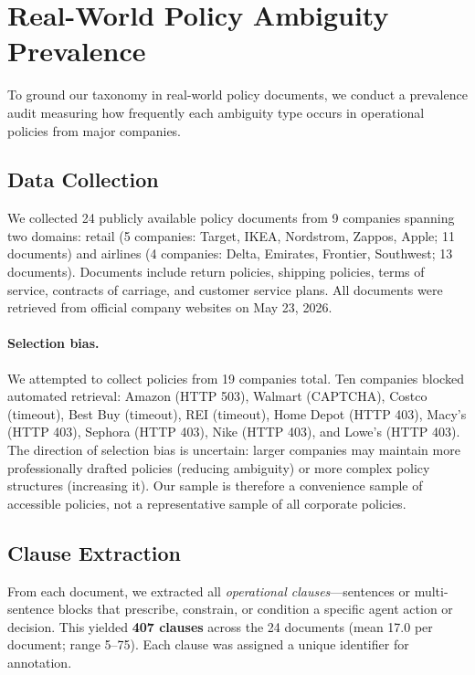 \section{Real-World Policy Ambiguity Prevalence}
\label{app:prevalence}

To ground our taxonomy in real-world policy documents, we conduct a prevalence audit measuring how frequently each ambiguity type occurs in operational policies from major companies.

\subsection{Data Collection}

We collected 24 publicly available policy documents from 9 companies spanning two domains: retail (5 companies: Target, IKEA, Nordstrom, Zappos, Apple; 11 documents) and airlines (4 companies: Delta, Emirates, Frontier, Southwest; 13 documents). Documents include return policies, shipping policies, terms of service, contracts of carriage, and customer service plans. All documents were retrieved from official company websites on May 23, 2026.

\paragraph{Selection bias.}
We attempted to collect policies from 19 companies total. Ten companies blocked automated retrieval: Amazon (HTTP 503), Walmart (CAPTCHA), Costco (timeout), Best Buy (timeout), REI (timeout), Home Depot (HTTP 403), Macy's (HTTP 403), Sephora (HTTP 403), Nike (HTTP 403), and Lowe's (HTTP 403).
The direction of selection bias is uncertain: larger companies may maintain more professionally drafted policies (reducing ambiguity) or more complex policy structures (increasing it). Our sample is therefore a convenience sample of accessible policies, not a representative sample of all corporate policies.

\subsection{Clause Extraction}

From each document, we extracted all \emph{operational clauses}---sentences or multi-sentence blocks that prescribe, constrain, or condition a specific agent action or decision. This yielded \textbf{407 clauses} across the 24 documents (mean 17.0 per document; range 5--75). Each clause was assigned a unique identifier for annotation.

